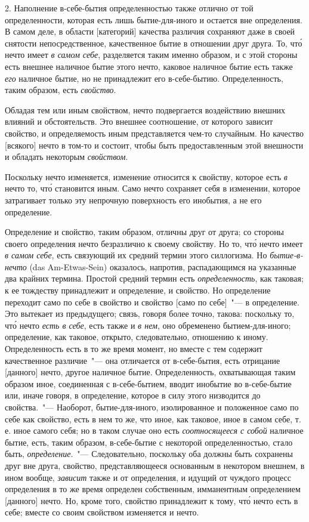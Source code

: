 2. Наполнение в-себе-бытия определенностью также
отлично от той определенности, которая есть лишь бытие-для-иного
и остается вне определения. В самом деле, в
области [категорий] качества различия сохраняют даже
в своей снятости непосредственное, качественное бытие в
отношении друг друга. То, чт\'о нечто имеет \emph{в самом себе},
разделяется таким именно образом, и с этой стороны
есть внешнее наличное бытие этого нечто, каковое наличное
бытие есть также \emph{его} наличное бытие, но не принадлежит
его в-себе-бытию. Определенность, таким образом,
есть \emph{свойство}.

Обладая тем или иным свойством, нечто подвергается
воздействию внешних влияний и обстоятельств. Это внешнее
соотношение, от которого зависит свойство, и определяемость
иным представляется чем-то случайным. Но
качество [всякого] нечто в том-то и состоит, чтобы быть
предоставленным этой внешности и обладать некоторым
\emph{свойством}.

Поскольку нечто изменяется, изменение относится
к свойству, которое есть \emph{в} нечто то, чт\'о становится иным.
Само нечто сохраняет себя в изменении, которое затрагивает
только эту непрочную поверхность его инобытия,
а не его определение.

Определение и свойство, таким образом, отличны
друг от друга; со стороны своего определения нечто безразлично
к своему свойству. Но то, чт\'о нечто имеет
\emph{в самом себе}, есть связующий их средний термин этого
силлогизма. Но \emph{бытие-в-нечто} (das Am-Etwas-Sein) оказалось,
напротив, распадающимся на указанные два крайних
термина. Простой средний термин есть \emph{определенность},
как таковая; к ее тождеству принадлежит и определение,
и свойство. Но определение переходит само по
себе в свойство и свойство [само по себе]~"--- в определение.
Это вытекает из предыдущего; связь, говоря более
точно, такова: поскольку то, чт\'о нечто \emph{есть в себе}, есть
также и \emph{в нем}, оно обременено бытием-для-иного; определение,
как таковое, открыто, следовательно, отношению
к иному. Определенность есть в то же время момент, но
вместе с тем содержит качественное различие~"--- она
отличается от в-себе-бытия, есть отрицание [данного] нечто,
другое наличное бытие. Определенность, охватывающая
таким образом иное, соединенная с в-себе-бытием,
вводит инобытие во в-себе-бытие или, иначе говоря, в
определение, которое в силу этого низводится до свойства.~"---
Наоборот, бытие-для-иного, изолированное и положенное
само по себе как свойство, есть в нем то же, что
иное, как таковое, иное в самом себе, т.\,е. иное самого
себя; но в таком случае оно есть \emph{соотносящееся с собой}
наличное бытие, есть, таким образом, в-себе-бытие с некоторой
определенностью, стало быть, \emph{определение}.~"---
Следовательно, поскольку оба должны быть сохранены
друг вне друга, свойство, представляющееся основанным
в некотором внешнем, в ином вообще, \emph{зависит} также и
от определения, и идущий от чуждого процесс определения
в то же время определен собственным, имманентным
определением [данного] нечто. Но, кроме того, свойство
принадлежит к тому, чт\'о нечто есть в себе; вместе со
своим свойством изменяется и нечто.

